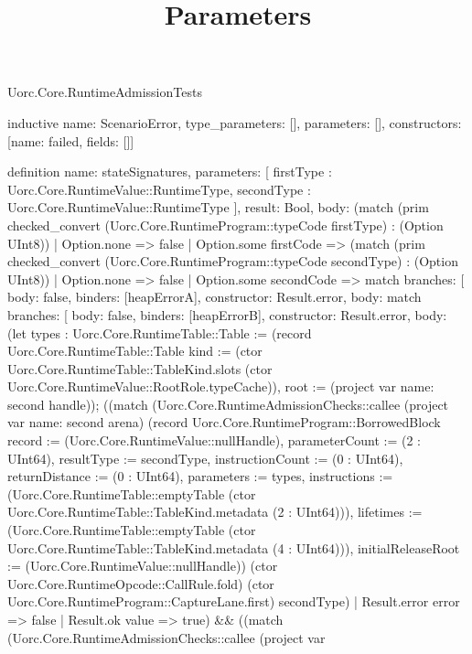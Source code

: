 \begin{lexlean}{Uorc.Core.RuntimeAdmissionTests}
\title{Parameters}
\begin{semanticmodule}
inductive{
  name: ScenarioError,
  type_parameters: [],
  parameters: [],
  constructors: [{name: failed, fields: []}]
}

definition{
  name: stateSignatures,
  parameters: [
    firstType : Uorc.Core.RuntimeValue::RuntimeType,
    secondType : Uorc.Core.RuntimeValue::RuntimeType
  ],
  result: Bool,
  body: (match (prim checked_convert (Uorc.Core.RuntimeProgram::typeCode firstType) : (Option UInt8))
    | Option.none => false
    | Option.some firstCode => (match (prim checked_convert (Uorc.Core.RuntimeProgram::typeCode secondType) : (Option UInt8))
      | Option.none => false
      | Option.some secondCode => match{
        branches: [
          {body: false, binders: [heapErrorA], constructor: Result.error},
          {
            body: match{
              branches: [
                {body: false, binders: [heapErrorB], constructor: Result.error},
                {
                  body: (let types : Uorc.Core.RuntimeTable::Table := (record Uorc.Core.RuntimeTable::Table {kind := (ctor Uorc.Core.RuntimeTable::TableKind.slots (ctor Uorc.Core.RuntimeValue::RootRole.typeCache)), root := (project var{
                    name: second
                  } handle)}); ((match (Uorc.Core.RuntimeAdmissionChecks::callee (project var{
                      name: second
                    } arena) (record Uorc.Core.RuntimeProgram::BorrowedBlock {record := (Uorc.Core.RuntimeValue::nullHandle), parameterCount := (2 : UInt64), resultType := secondType, instructionCount := (0 : UInt64), returnDistance := (0 : UInt64), parameters := types, instructions := (Uorc.Core.RuntimeTable::emptyTable (ctor Uorc.Core.RuntimeTable::TableKind.metadata (2 : UInt64))), lifetimes := (Uorc.Core.RuntimeTable::emptyTable (ctor Uorc.Core.RuntimeTable::TableKind.metadata (4 : UInt64))), initialReleaseRoot := (Uorc.Core.RuntimeValue::nullHandle)}) (ctor Uorc.Core.RuntimeOpcode::CallRule.fold) (ctor Uorc.Core.RuntimeProgram::CaptureLane.first) secondType)
                    | Result.error error => false
                    | Result.ok value => true) && ((match (Uorc.Core.RuntimeAdmissionChecks::callee (project var{
}}}}}}
\end{semanticmodule}
\end{lexlean}
